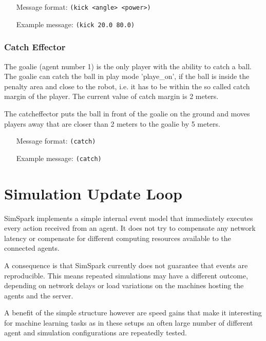 \begin{itemize}
	\item[Message format:] \texttt{(kick <angle> <power>)}
	\item[Example message:] \texttt{(kick 20.0 80.0)}
\end{itemize}


\subsubsection{Catch Effector}
\label{sec:catcheffector}

The goalie (agent number 1) is the only player with the ability to
catch a ball. The goalie can catch the ball in play mode 'playe\_on',
if the ball is inside the penalty area and close to the robot, i.e. it
has to be within the so called catch margin of the player. The current
value of catch margin is 2 meters.

The catcheffector puts the ball in front of the goalie on the ground
and moves players away that are closer than 2 meters to the goalie by
5 meters.

\begin{itemize}
	\item[Message format:] \texttt{(catch)}
	\item[Example message:] \texttt{(catch)}
\end{itemize}


\section{Simulation Update Loop}

SimSpark implements a simple internal event model that immediately
executes every action received from an agent. It does not try to
compensate any network latency or compensate for different computing
resources available to the connected agents.

A consequence is that SimSpark currently does not guarantee that
events are reproducible. This means repeated simulations may have a
different outcome, depending on network delays or load variations on
the machines hosting the agents and the server.

A benefit of the simple structure however are speed gains that make it
interesting for machine learning tasks as in these setups an often
large number of different agent and simulation configurations are
repeatedly tested.

